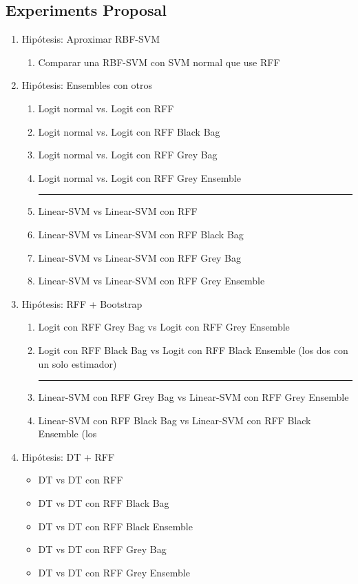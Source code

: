 \subsection{Experiments Proposal}
\begin{note}
  \begin{enumerate}
    \item Hipótesis: Aproximar RBF-SVM
    \begin{enumerate}
      \item Comparar una RBF-SVM con SVM normal que use RFF
    \end{enumerate}
    \item Hipótesis: Ensembles con otros
    \begin{enumerate}
      \item Logit normal vs. Logit con RFF
      \item Logit normal vs. Logit con RFF Black Bag
      \item Logit normal vs. Logit con RFF Grey Bag
      \item Logit normal vs. Logit con RFF Grey Ensemble
      \hrule
      \item Linear-SVM vs Linear-SVM con RFF
      \item Linear-SVM vs Linear-SVM con RFF Black Bag
      \item Linear-SVM vs Linear-SVM con RFF Grey Bag
      \item Linear-SVM vs Linear-SVM con RFF Grey Ensemble
    \end{enumerate}
    \item Hipótesis: RFF + Bootstrap
    \begin{enumerate}
      \item Logit con RFF Grey Bag vs Logit con RFF Grey Ensemble
      \item Logit con RFF Black Bag vs Logit con RFF Black Ensemble (los
      dos con un solo estimador)
      \hrule
      \item Linear-SVM con RFF Grey Bag vs Linear-SVM con RFF Grey Ensemble
      \item Linear-SVM con RFF Black Bag vs Linear-SVM con RFF Black Ensemble (los
    \end{enumerate}
    \item Hipótesis: DT + RFF
    \begin{itemize}
      \item DT vs DT con RFF
      \item DT vs DT con RFF Black Bag
      \item DT vs DT con RFF Black Ensemble
      \item DT vs DT con RFF Grey Bag
      \item DT vs DT con RFF Grey Ensemble
    \end{itemize}
  \end{enumerate}
\end{note}

